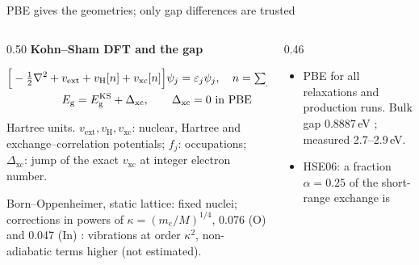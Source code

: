 
\begin{frame}[t]{PBE gives the geometries; only gap differences are trusted}
  \fivedense\fiveTop
  \begin{columns}[T,onlytextwidth]
    \begin{column}{0.50\textwidth}
      \begingroup\footnotesize\textbf{Kohn--Sham DFT and the gap}\xdef\fiveksfn{\the\value{footnote}}\par\endgroup
      \vspace{-3mm}
      \begingroup\footnotesize
      \begin{gather*}
        \Big[-\tfrac12\nabla^2 + v_{\mathrm{ext}} + v_{\mathrm{H}}[n] + v_{\mathrm{xc}}[n]\Big]\psi_j = \varepsilon_j\psi_j ,
        \quad n = \textstyle\sum_j f_j|\psi_j|^2 \\
        E_{\mathrm{g}} = E_{\mathrm{g}}^{\mathrm{KS}} + \Delta_{\mathrm{xc}}, \qquad \Delta_{\mathrm{xc}} = 0 \text{ in PBE}
      \end{gather*}\par\endgroup
      \vspace{-1.5mm}
      \begingroup\scriptsize\color{inkgrey}Hartree units. $v_{\mathrm{ext}}, v_{\mathrm{H}}, v_{\mathrm{xc}}$: nuclear,
        Hartree and exchange--correlation potentials; $f_j$: occupations; $\Delta_{\mathrm{xc}}$: jump of the exact
        $v_{\mathrm{xc}}$ at integer electron number.\par\endgroup
      \vspace{1mm}
      \begingroup\footnotesize Born--Oppenheimer, static lattice\footnotemark[\fiveksfn]: fixed nuclei; corrections in powers
        of $\kappa = (m_e/M)^{1/4}$, 0.076 (O) and 0.047 (In) : vibrations at order $\kappa^2$,
        non-adiabatic terms higher (not estimated).\par\endgroup
    \end{column}
    \begin{column}{0.46\textwidth}
      \begin{itemize}
        \item PBE\xdef\fivexcfn{\the\value{footnote}} for all relaxations and production runs. Bulk gap 0.8887\,eV ;
          measured 2.7--2.9\,eV.
        \item HSE06\footnotemark[\fivexcfn]: a fraction $\alpha = 0.25$ of the short-range exchange is

\end{itemize}
\end{column}
\end{columns}
\end{frame}

